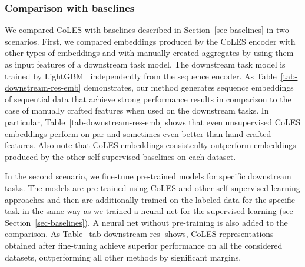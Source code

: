 \documentclass[sigconf]{acmart}
\begin{document}
\subsubsection{Comparison with baselines}

We compared CoLES with baselines described in Section~\ref{sec-baselines} in two scenarios. First, we compared embeddings produced by the CoLES encoder with other types of embeddings and with manually created aggregates by using them as input features of a downstream task model. The downstream task model is trained by LightGBM~\citep{Ke2017LightGBMAH}  independently from the sequence encoder. As Table~\ref{tab-downstream-res-emb} demonstrates, our method generates sequence embeddings of sequential data that achieve strong performance results in comparison to the case of manually crafted features when used on the downstream tasks.
In particular, Table~\ref{tab-downstream-res-emb} shows that even unsupervised CoLES embeddings perform on par and sometimes even better than hand-crafted features. Also note that CoLES embeddings consistenlty outperform embeddings produced by the other self-supervised baselines on each dataset.

In the second scenario, we fine-tune pre-trained models for specific downstream tasks. The models are pre-trained using CoLES and other self-supervised learning approaches and then are additionally trained on the labeled data for the specific task in the same way as we trained a neural net for the supervised learning (see Section~\ref{sec-baselines}). A neural net without pre-training is also added to the comparison. As Table~\ref{tab-downstream-res} shows, CoLES representations obtained after fine-tuning achieve superior performance on all the considered datasets, outperforming all other methods by significant margins.
\end{document}
